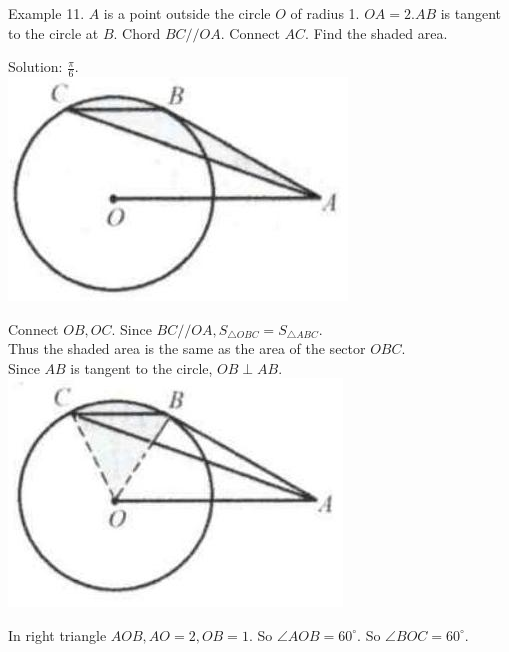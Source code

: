 \documentclass[10pt]{article}
\begin{document}
Example 11. \(A\) is a point outside the circle \(O\) of radius 1. \(O A=2 . A B\) is tangent to the circle at \(B\). Chord \(B C / / O A\). Connect \(A C\). Find the shaded area.

Solution: \(\frac{\pi}{6}\).\\
\includegraphics[max width=\textwidth, center]{2025_04_17_97bc1f7e44d93c271a88g-151(1)}

Connect \(O B, O C\). Since \(B C / / O A, S_{\triangle O B C}=S_{\triangle A B C}\).\\
Thus the shaded area is the same as the area of the sector \(O B C\).\\
Since \(A B\) is tangent to the circle, \(O B \perp A B\).\\
\includegraphics[max width=\textwidth, center]{2025_04_17_97bc1f7e44d93c271a88g-151(3)}

In right triangle \(A O B, A O=2, O B=1\). So \(\angle A O B=60^{\circ}\). So \(\angle B O C=60^{\circ}\).
\end{document}
